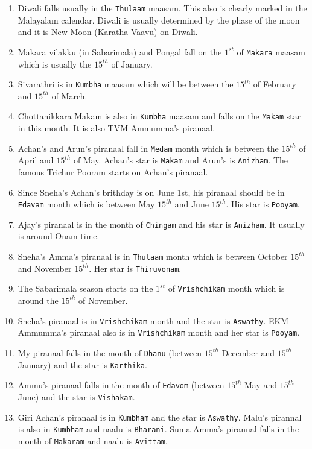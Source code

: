 \documentclass[10pt,twoside]{article}
\begin{document}
\begin{enumerate}
\item Diwali falls usually in the \verb|Thulaam| maasam. This also is clearly marked in the Malayalam calendar. Diwali is usually determined by the phase of the moon and it is New Moon (Karatha Vaavu) on Diwali.
\item Makara vilakku (in Sabarimala) and Pongal fall on the $1^{st}$ of \verb|Makara| maasam which is usually the $15^{th}$ of January.
\item Sivarathri is in \verb|Kumbha| maasam which will be between the $15^{th}$ of February and $15^{th}$ of March.
\item Chottanikkara Makam is also in \verb|Kumbha| maasam and falls on the \verb|Makam| star in this month. It is also TVM Ammumma's piranaal.
\item Achan's and Arun's piranaal fall in \verb|Medam| month which is between the $15^{th}$ of April and $15^{th}$ of May. Achan's star is \verb|Makam| and Arun's is \verb|Anizham|. The famous Trichur Pooram starts on Achan's piranaal.
\item Since Sneha's Achan's brithday is on June 1st, his piranaal should be in \verb|Edavam| month which is between May $15^{th}$ and June $15^{th}$. His star is \verb|Pooyam|.
\item Ajay's piranaal is in the month of \verb|Chingam| and his star is \verb|Anizham|. It usually is around Onam time. 
\item Sneha's Amma's piranaal is in \verb|Thulaam| month which is between October $15^{th}$ and November $15^{th}$. Her star is \verb|Thiruvonam|.
\item The Sabarimala season starts on the $1^{st}$ of \verb|Vrishchikam| month which is around the $15^{th}$ of November.
\item Sneha's piranaal is in \verb|Vrishchikam| month and the star is \verb|Aswathy|. EKM Ammumma's piranaal also is in \verb|Vrishchikam| month and her star is \verb|Pooyam|.
\item My piranaal falls in the month of \verb|Dhanu| (between $15^{th}$ December and $15^{th}$ January) and the star is \verb|Karthika|. 
\item Ammu's piranaal falls in the month of \verb|Edavom| (between $15^{th}$ May and $15^{th}$ June) and the star is \verb|Vishakam|. 
\item Giri Achan's piranaal is in \verb|Kumbham| and the star is \verb|Aswathy|. Malu's pirannal is also in \verb|Kumbham| and naalu is \verb|Bharani|. Suma Amma's pirannal falls in the month of \verb|Makaram| and naalu is \verb|Avittam|. 

\end{enumerate}
\end{document}

